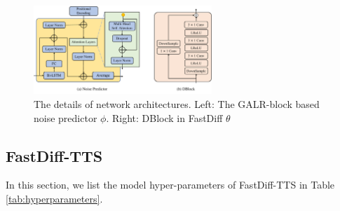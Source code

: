 


\begin{figure}
    \vspace{-8mm}
    \centering
    \includegraphics[width=0.6\textwidth,trim={1.0cm 0cm 1.0cm 0cm}]{Figures/arch2.pdf}
    \vspace{-3mm}
   \caption{The details of network architectures. Left: The GALR-block based noise predictor $\phi$. Right: DBlock in FastDiff $\theta$} 
    \label{fig:noise_predictor}
  \end{figure}

\subsection{FastDiff-TTS} \label{appendix:fastDiff_tts}
In this section, we list the model hyper-parameters of FastDiff-TTS in Table \ref{tab:hyperparameters}.


